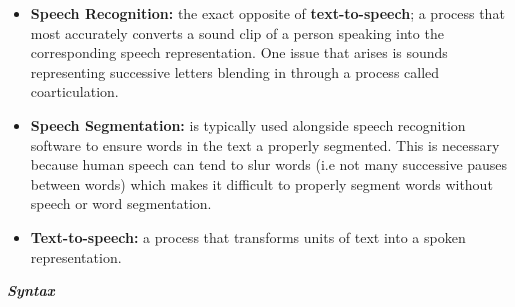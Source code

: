 \documentclass{article}
\begin{document}
\begin{itemize}
    \item \textbf{Speech Recognition:} the exact opposite of \textbf{text-to-speech}; a process that most accurately converts a sound clip of a person speaking into the corresponding speech representation. One issue that arises is sounds representing successive letters blending in through a process called coarticulation. 
    \item \textbf{Speech Segmentation:} is typically used alongside speech recognition software to ensure words in the text a properly segmented. This is necessary because human speech can tend to slur words (i.e not many successive pauses between words) which makes it difficult to properly segment words without speech or word segmentation. 
    \item \textbf{Text-to-speech:} a process that transforms units of text into a spoken representation. 
\end{itemize}

\vspace{0.25cm}

\hspace{-0.4cm} \textbf{\textit{Syntax}}
\end{document}
